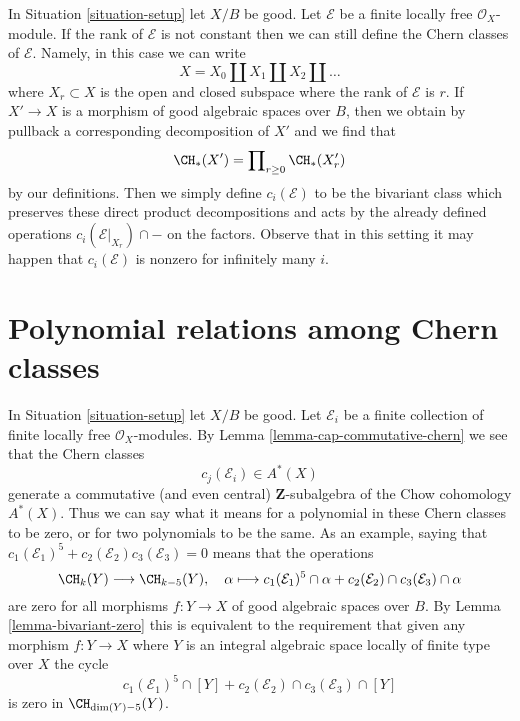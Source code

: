 \begin{remark}
\label{remark-extend-to-finite-locally-free}
In Situation \ref{situation-setup} let $X/B$ be good.
Let $\mathcal{E}$ be a finite locally free $\mathcal{O}_X$-module.
If the rank of $\mathcal{E}$ is not constant then we can
still define the Chern classes of $\mathcal{E}$. Namely, in this
case we can write
$$
X = X_0 \amalg X_1 \amalg X_2 \amalg \ldots
$$
where $X_r \subset X$ is the open and closed subspace where
the rank of $\mathcal{E}$ is $r$. If $X' \to X$ is a morphism
of good algebraic spaces over $B$, then we obtain by
pullback a corresponding decomposition of $X'$ and we find that
$$
\CH_*(X') = \prod\nolimits_{r \geq 0} \CH_*(X'_r)
$$
by our definitions. Then we simply define $c_i(\mathcal{E})$
to be the bivariant class which preserves these direct
product decompositions and acts by the already defined
operations $c_i(\mathcal{E}|_{X_r}) \cap -$
on the factors. Observe that in this setting it may happen
that $c_i(\mathcal{E})$ is nonzero for infinitely many $i$.
\end{remark}












\section{Polynomial relations among Chern classes}
\label{section-relations-chern-classes}

\noindent
In Situation \ref{situation-setup} let $X/B$ be good.
Let $\mathcal{E}_i$ be a finite collection of finite locally
free $\mathcal{O}_X$-modules. By Lemma \ref{lemma-cap-commutative-chern}
we see that the Chern classes
$$
c_j(\mathcal{E}_i) \in A^*(X)
$$
generate a commutative (and even central) $\mathbf{Z}$-subalgebra of the
Chow cohomology $A^*(X)$.
Thus we can say what it means for a polynomial in these Chern classes
to be zero, or for two polynomials to be the same. As an example, saying that
$c_1(\mathcal{E}_1)^5 + c_2(\mathcal{E}_2)c_3(\mathcal{E}_3) = 0$
means that the operations
$$
\CH_k(Y) \longrightarrow \CH_{k - 5}(Y), \quad
\alpha \longmapsto
c_1(\mathcal{E}_1)^5 \cap \alpha +
c_2(\mathcal{E}_2) \cap c_3(\mathcal{E}_3) \cap \alpha
$$
are zero for all morphisms $f : Y \to X$ of good algebraic spaces over $B$.
By Lemma \ref{lemma-bivariant-zero}
this is equivalent to the requirement that given any morphism
$f : Y \to X$ where $Y$ is an integral algebraic space
locally of finite type over $X$ the cycle
$$
c_1(\mathcal{E}_1)^5 \cap [Y] +
c_2(\mathcal{E}_2) \cap c_3(\mathcal{E}_3) \cap [Y]
$$
is zero in $\CH_{\dim(Y) - 5}(Y)$.

